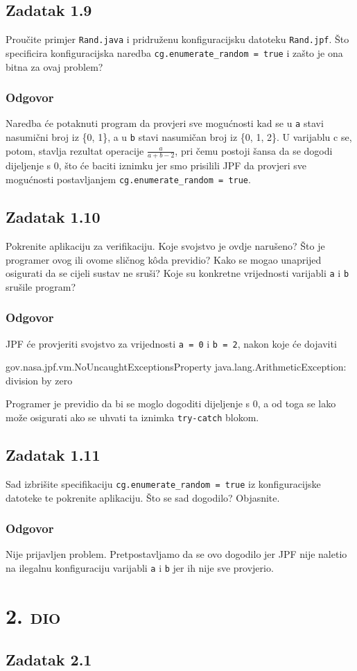 \documentclass{article}
\newcommand{\sekcija}[1]{\section{\textsc{#1}}}
\newcommand{\dio}[1]{\sekcija{#1. dio}}
\newcommand{\zadatak}[1]{\subsection{Zadatak #1}}
\newcommand{\odgovor}{\subsubsection*{Odgovor}}
\newcommand{\code}[1]{\colorbox{blue!11}{\texttt{#1}}}
\begin{document}
\zadatak{1.9}

Proučite primjer \texttt{Rand.java} i pridruženu konfiguracijsku datoteku \texttt{Rand.jpf}. Što specificira konfiguracijska naredba \code{cg.enumerate\_random = true} i zašto je ona bitna za ovaj problem? 

\odgovor

Naredba će potaknuti program da provjeri sve mogućnosti kad se u \texttt{a} stavi nasumični broj iz \{0, 1\}, a u \texttt{b} stavi nasumičan broj iz \{0, 1, 2\}. U varijablu c se, potom, stavlja rezultat operacije $\frac{a}{a + b - 2}$, pri čemu postoji šansa da se dogodi dijeljenje s 0, što će baciti iznimku jer smo prisilili JPF da provjeri sve mogućnosti postavljanjem \code{cg.enumerate\_random = true}.

\pagebreak  %

\zadatak{1.10}

Pokrenite aplikaciju za verifikaciju. Koje svojstvo je ovdje narušeno? Što je programer ovog ili ovome sličnog kôda previdio? Kako se mogao unaprijed osigurati da se cijeli sustav ne sruši? Koje su konkretne vrijednosti varijabli \texttt{a} i \texttt{b} srušile program?

\odgovor

JPF će provjeriti svojstvo za vrijednosti \texttt{a = 0} i \texttt{b = 2}, nakon koje će dojaviti

\begin{ccode}
gov.nasa.jpf.vm.NoUncaughtExceptionsProperty
java.lang.ArithmeticException: division by zero
\end{ccode}

\noindent
Programer je previdio da bi se moglo dogoditi dijeljenje s 0, a od toga se lako može osigurati ako se uhvati ta iznimka \texttt{try-catch} blokom.

\zadatak{1.11}

Sad izbrišite specifikaciju \code{cg.enumerate\_random = true} iz konfiguracijske datoteke te pokrenite aplikaciju. Što se sad dogodilo? Objasnite.

\odgovor

Nije prijavljen problem. Pretpostavljamo da se ovo dogodilo jer JPF nije naletio na ilegalnu konfiguraciju varijabli \texttt{a} i \texttt{b} jer ih nije sve provjerio.

\pagebreak





\dio{2}


\zadatak{2.1}
\end{document}
